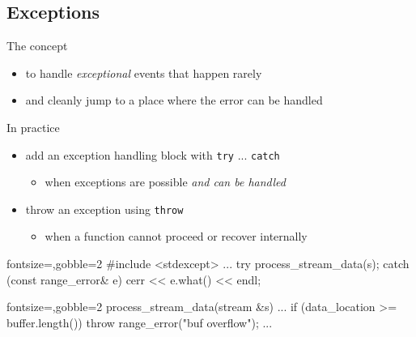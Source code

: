 \subsection[except]{Exceptions}

\begin{frame}[fragile]
  \begin{block}{The concept}
    \begin{itemize}
      \item to handle \textit{exceptional} events that happen rarely
      \item and cleanly jump to a place where the error can be handled
    \end{itemize}
  \end{block}
  \begin{block}{In practice}
    \begin{itemize}
      \item add an exception handling block with \texttt{try} ... \texttt{catch}
      \begin{itemize}
        \item when exceptions are possible \textit{and can be handled}
      \end{itemize}
      \item throw an exception using \texttt{throw}
      \begin{itemize}
        \item when a function cannot proceed or recover internally
      \end{itemize}
    \end{itemize}
  \end{block}
  \begin{multicols}{2}
    \begin{cppcode*}{fontsize=\scriptsize,gobble=2}
      #include <stdexcept>
      ...
      try {
        process_stream_data(s);
      } catch (const range_error& e) {
        cerr << e.what() << endl;
      }
    \end{cppcode*}
    \columnbreak
    \begin{cppcode*}{fontsize=\scriptsize,gobble=2}
      process_stream_data(stream &s) {
        ...
        if (data_location >= buffer.length()) {
          throw range_error("buf overflow");
        }
        ...
      }
    \end{cppcode*}
  \end{multicols}
\end{frame}

